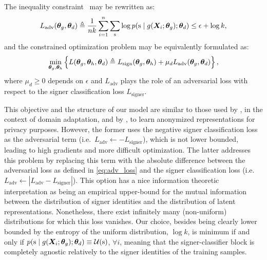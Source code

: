 The inequality constraint~ may be rewritten as:
\begin{equation}
\label{eq:adv_loss}
L_{\text{adv}}({\bm{\theta}}_g, {\bm{\theta}}_d) \triangleq \frac{1}{nk}\sum_{i=1}^n \sum_{{\textnormal{s}}} \log p({\textnormal{s}} \mid g({\bm{X}}_{i}; {\bm{\theta}}_g); {\bm{\theta}}_d) \leq \epsilon + \log k,
\end{equation}
and the constrained optimization problem may be equivalently formulated as:
\begin{equation}
\label{eq:tr_obj}
\min_{{\bm{\theta}}_g, {\bm{\theta}}_h}  \left\lbrace L({\bm{\theta}}_g, {\bm{\theta}}_h, {\bm{\theta}}_d) \triangleq L_{\text{sign}}({\bm{\theta}}_g, {\bm{\theta}}_h) + \mu_d L_{\text{adv}}({\bm{\theta}}_g, {\bm{\theta}}_d) \right\rbrace,
\end{equation}
where $\mu_d \geq 0$ depends on $\epsilon$ and $L_{\text{adv}}$ plays the role of an adversarial loss with respect to the signer classification loss $L_{\text{signer}}$.

This objective and the structure of our model are similar to those used by \citet{Ganin2015}, in the context of domain adaptation, and by \citet{Feutry2018}, to learn anonymized representations for privacy purposes. However, the former uses the negative signer classification loss as the adversarial term (i.e.\ $L_{\text{adv}} \leftarrow -L_{\text{signer}}$), which is not lower bounded, leading to high gradients and more difficult optimization. The latter addresses this problem by replacing this term with the absolute difference between the adversarial loss as defined in \eqref{eq:adv_loss} and the signer classification loss (i.e.\ $L_{\text{adv}} \leftarrow |L_{\text{adv}} - L_{\text{signer}}|$). This option has a nice information theoretic interpretation as being an empirical upper-bound for the mutual information between the distribution of signer identities and the distribution of latent representations. Nonetheless, there exist infinitely many (non-uniform) distributions for which this loss vanishes. Our choice, besides being clearly lower bounded by the entropy of the uniform distribution, $\log k$, is minimum if and only if $p({\textnormal{s}} \mid g({\bm{X}}_{i}; {\bm{\theta}}_g); {\bm{\theta}}_d) \equiv {\mathcal{U}}({\textnormal{s}})$, $\forall i$, meaning that the signer-classifier block is completely agnostic relatively to the signer identities of the training samples.

